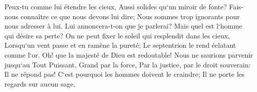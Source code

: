 \verse Peux-tu comme lui étendre les cieux, Aussi solides qu`un miroir de fonte? 
\verse Fais-nous connaître ce que nous devons lui dire; Nous sommes trop ignorants pour nous adresser à lui. 
\verse Lui annoncera-t-on que je parlerai? Mais quel est l`homme qui désire sa perte? 
\verse On ne peut fixer le soleil qui resplendit dans les cieux, Lorsqu`un vent passe et en ramène la pureté; 
\verse Le septentrion le rend éclatant comme l`or. Oh! que la majesté de Dieu est redoutable! 
\verse Nous ne saurions parvenir jusqu`au Tout Puissant, Grand par la force, Par la justice, par le droit souverain: Il ne répond pas! 
\verse C`est pourquoi les hommes doivent le craindre; Il ne porte les regards sur aucun sage. 

